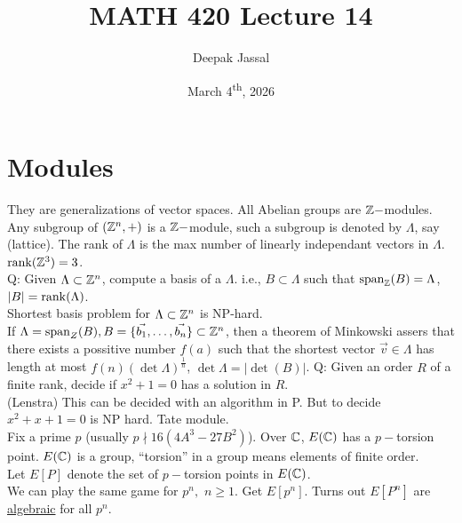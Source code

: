 \documentclass[12pt]{article}
\title{MATH 420 Lecture 14}
\author{Deepak Jassal}
\date{March 4\textsuperscript{th}, 2026}
\begin{document}
\maketitle
{}
\section*{Modules}
They are generalizations of vector spaces.
All Abelian groups are $\mathbb{Z}-$modules.
Any subgroup of $(\mathbb{Z}^n,+)$ is a $\mathbb{Z}-$module, such a subgroup is denoted by $\Lambda$, say (lattice). The rank of $\Lambda$ is the max number of linearly independant vectors in $\Lambda$.\\
$\operatorname{rank}(\mathbb{Z}^3)=3$.\\
Q: Given $\Lambda\subset\mathbb{Z}^n$, compute a basis of a $\Lambda$. i.e., $B\subset\Lambda$ such that $\operatorname{span}_{\mathbb{Z}}(B)=\Lambda$, $|B|=\operatorname{rank}(\Lambda)$.\\
Shortest basis problem for $\Lambda\subset\mathbb{Z}^n$ is NP-hard.\\
If $\Lambda=\operatorname{span}_Z(B),B=\{\vec{b_1},\dots,\vec{b_n}\}\subset\mathbb{Z}^n$, then a theorem of Minkowski assers that there exists a possitive number $f(a)$ such that the shortest vector $\vec{v}\in\Lambda$ has length at most $f(n)(\det\Lambda)^{\frac{1}{n}}$, $\det\Lambda=|\det(B)|$.
Q: Given an order $R$ of a finite rank, decide if $x^2+1=0$ has a solution in $R$.\\
(Lenstra) This can be decided with an algorithm in P. But to decide $x^2+x+1=0$ is NP hard. 
Tate module.\\
Fix a prime $p$ (usually $p\nmid16(4A^3-27B^2)$). Over $\mathbb{C}$, $E(\mathbb{C})$ has a $p-$torsion point. $E(\mathbb{C})$ is a group, ``torsion'' in a group means elements of finite order.\\
Let $E[P]$ denote the set of $p-$torsion points in $E(\mathbb{C})$.\\
We can play the same game for $p^n,$ $n\geq1$. Get $E[p^n]$. Turns out $E[P^n]$ are \underline{algebraic} for all $p^n$.
\end{document}
